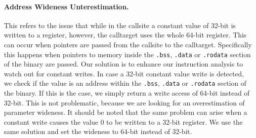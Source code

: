 \paragraph{Address Wideness Unterestimation.} This refers to the issue that while in the callsite a constant value of 32-bit is written to a register, however, 
the calltarget uses the whole 64-bit register. This can occur when pointers are passed from the callsite to the calltarget. Specifically this happens 
when pointers to memory inside the \texttt{.bss}, \texttt{.data} or \texttt{.rodata} section of the binary are passed.
Our solution is to enhance our instruction analysis to watch out for constant writes. In case a 32-bit constant value write is detected, we check if the
value is an address within the \texttt{.bss}, \texttt{.data} or \texttt{.rodata} section of the binary. If this is the case, we simply return a write access of 64-bit 
instead of 32-bit. This is not problematic, because we are looking for an overestimation of parameter wideness.
It should be noted that the same problem can arise when a constant write causes the value 0 to be written to a 32-bit register. We use the same solution
and set the wideness to 64-bit instead of 32-bit.
%
%
%
